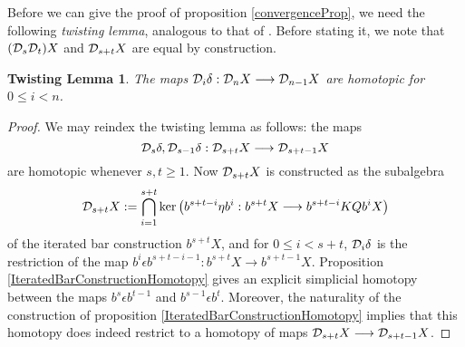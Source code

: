 \documentclass[11pt]{amsart}
\theoremstyle{plain}
\newtheorem{twistinglemma}[thm]{Twisting Lemma}
\newcommand{\caldup}[1]{\calD_{\smash{#1}}}
\begin{document}
Before we can give the proof of proposition \ref{convergenceProp}, we need the following \emph{twisting lemma}, analogous to that of \cite{BK_pairings.pdf}. Before stating it, we note that $(\caldup{s}\caldup{t})X$ and $\caldup{s+t}X$ are equal by construction.
\begin{twistinglemma}
\label{DsDt=Dt+s}
The maps $\caldup{i}\delta:\caldup{n}X\to \caldup{n-1}X$ are homotopic for $0\leq i< n$.
\end{twistinglemma}
\begin{proof}
We may reindex the twisting lemma as follows: the maps 
\[\caldup{s}\delta,\caldup{s-1}\delta:\caldup{s+t}X\to \caldup{s+t-1}X\]
are homotopic whenever $s,t\geq1$. Now $\caldup{s+t}X$ is constructed as the subalgebra
\[\caldup{s+t}X:= \bigcap_{i=1}^{s+t}\ker\!\left(b^{s+t-i}\eta b^{i}:b^{s+t}X\to b^{s+t-i}KQb^{i}X\right)\]
of the iterated bar construction $b^{s+t}X$, and for $0\leq i<s+t$, $\caldup{i}\delta$ is the restriction of the map $b^i\epsilon b^{s+t-i-1}:b^{s+t}X\to b^{s+t-1}X$.
%
Proposition \ref{IteratedBarConstructionHomotopy} gives an explicit simplicial homotopy between the maps $b^s\epsilon b^{t-1}$ and $b^{s-1}\epsilon b^{t}$. Moreover, the naturality of the construction of proposition \ref{IteratedBarConstructionHomotopy} implies that this homotopy does indeed restrict to a homotopy of maps $\caldup{s+t}X\to \caldup{s+t-1}X$.%
\end{proof}
\end{document}
